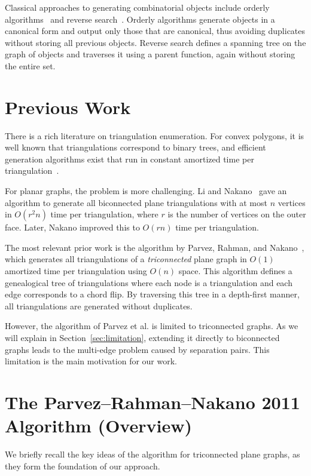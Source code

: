 Classical approaches to generating combinatorial objects include orderly algorithms~\cite{mckay1998} and reverse search~\cite{avis1996}. 
Orderly algorithms generate objects in a canonical form and output only those that are canonical, thus avoiding duplicates without storing all previous objects. 
Reverse search defines a spanning tree on the graph of objects and traverses it using a parent function, again without storing the entire set.

\section{Previous Work}
\label{sec:previous_work}

There is a rich literature on triangulation enumeration. 
For convex polygons, it is well known that triangulations correspond to binary trees, and efficient generation algorithms exist that run in constant amortized time per triangulation~\cite{hurtado1999}. 

For planar graphs, the problem is more challenging. 
Li and Nakano~\cite{li2001} gave an algorithm to generate all biconnected plane triangulations with at most \(n\) vertices in \(O(r^2 n)\) time per triangulation, where \(r\) is the number of vertices on the outer face. 
Later, Nakano improved this to \(O(r n)\) time per triangulation.

The most relevant prior work is the algorithm by Parvez, Rahman, and Nakano~\cite{parvez2011}, which generates all triangulations of a \emph{triconnected} plane graph in \(O(1)\) amortized time per triangulation using \(O(n)\) space. 
This algorithm defines a genealogical tree of triangulations where each node is a triangulation and each edge corresponds to a chord flip. 
By traversing this tree in a depth-first manner, all triangulations are generated without duplicates.

However, the algorithm of Parvez et al. is limited to triconnected graphs. 
As we will explain in Section~\ref{sec:limitation}, extending it directly to biconnected graphs leads to the multi-edge problem caused by separation pairs. 
This limitation is the main motivation for our work.

\section{The Parvez–Rahman–Nakano 2011 Algorithm (Overview)}
\label{sec:parvez_overview}

We briefly recall the key ideas of the algorithm for triconnected plane graphs, as they form the foundation of our approach.

